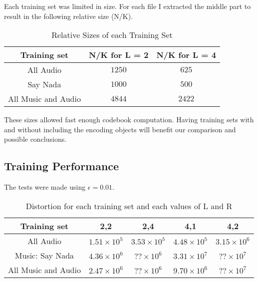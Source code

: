 \documentclass[a4paper, 11pt]{article}
\begin{document}
			Each training set was limited in size. 
			For each file I extracted the middle part to result in the following relative size (N/K).
				
			\begin{table}[H]
				\centering
				\begin{tabular}{c|c|c}
					\textbf{Training set} & \textbf{N/K for L = 2} 	& \textbf{N/K for L = 4} \\ \hline
					All Audio 			& $ 1250 $ 					& $ 625 $	 			 \\ \hline
					Say Nada			& $ 1000 $ 				  	& $ 500 $ \\ \hline	
					All Music and Audio & $ 4844 $					& $	2422 $ \\
				\end{tabular}
				\caption{Relative Sizes of each Training Set}
				\label{table:TrainSets}
			\end{table}
			
			These sizes allowed fast enough codebook computation.
			Having training sets with and without including the encoding objects will benefit our comparison and possible conclusions.
				
		\subsection{Training Performance}
		
			The tests were made using $ \epsilon = 0.01 $.
			\begin{table}[H]
				\centering
				\begin{tabular}{c|c|c|c|c}
					\textbf{Training set} & \textbf{2,2} 			& \textbf{2,4}			&  \textbf{4,1}				& \textbf{4,2} \\ \hline
					All Audio 			& $ 1.51 \times 10^{5} $ 	& $ 3.53 \times 10^{5} $& $4.48 \times 10^{5} $ 	& $ 3.15 \times 10^{6} $ \\ \hline
					Music: Say Nada		& $ 4.36 \times 10^{6} $ 	& $ ?? \times 10^{6} $	& $ 3.31 \times 10^{7} $  	& $ ??\times 10^{7} $ \\ \hline
					All Music and Audio & $ 2.47 \times 10^{6} $	& $	?? \times 10^{6}$	& $ 9.70 \times 10^{6} $	& $	?? \times 10^{7} $ \\
				\end{tabular}
				\caption{Distortion for each training set and each values of L and R}
				\label{table:TrainDist}
			\end{table}
			
\end{document}
